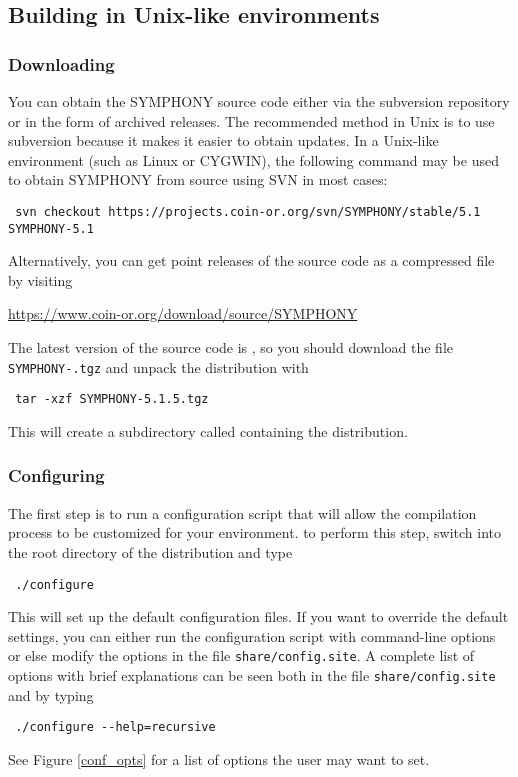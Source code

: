 \subsection{Building in Unix-like environments}
\label{getting_started_unix}

\subsubsection{Downloading}

You can obtain the SYMPHONY source code either via the subversion repository
or in the form of archived releases. The recommended method in Unix is to use
subversion because it makes it easier to obtain updates. In a Unix-like
environment (such as Linux or CYGWIN), the following command may be used to
obtain SYMPHONY from source using SVN in most cases: {\color{Brown}
\begin{verbatim}
 svn checkout https://projects.coin-or.org/svn/SYMPHONY/stable/5.1 SYMPHONY-5.1
\end{verbatim}
}
Alternatively, you can get point releases of the source code as a compressed
file by visiting
\begin{center}
 \url{https://www.coin-or.org/download/source/SYMPHONY}
\end{center}
The latest version of the source code is \VER, so you should download the file
{\color{Brown}\texttt{SYMPHONY-\VER.tgz}} and unpack the distribution with 
{\color{Brown}
\begin{verbatim}
 tar -xzf SYMPHONY-5.1.5.tgz
\end{verbatim}
} 
This will create a subdirectory called  containing
the distribution.

\subsubsection{Configuring}\label{configuring}

The first step is to run a configuration script that will allow the
compilation process to be customized for your environment. to perform this
step, switch into the root directory of the distribution and type
{\color{Brown}
\begin{verbatim}
 ./configure 
\end{verbatim}
} This will set up the default configuration files. If you want to override
the default settings, you can either run the configuration script with
command-line options or else modify the options in the file
{\color{Brown}\texttt{share/config.site}}. A complete list of options with
brief explanations can be seen both in the file
{\color{Brown}\texttt{share/config.site}} and by typing 
{\color{Brown}
\begin{verbatim}
 ./configure --help=recursive 
\end{verbatim}
}
See Figure \ref{conf_opts} for a list of options the user may want to set. 

